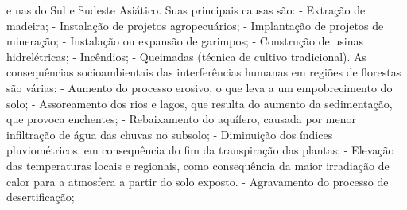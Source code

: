 e nas do Sul e Sudeste Asiático. Suas principais causas são:
- Extração de madeira;
- Instalação de projetos agropecuários;
- Implantação de projetos de mineração;
- Instalação ou expansão de garimpos;
- Construção de usinas hidrelétricas;
- Incêndios;
- Queimadas (técnica de cultivo tradicional).
As consequências socioambientais das interferências humanas em regiões de florestas são várias:
- Aumento do processo erosivo, o que leva a um empobrecimento do solo;
- Assoreamento dos rios e lagos, que resulta do aumento da sedimentação, que provoca enchentes;
- Rebaixamento do aquífero, causada por menor infiltração de água das chuvas no subsolo;
- Diminuição dos índices pluviométricos, em consequência do fim da transpiração das plantas;
- Elevação das temperaturas locais e regionais, como consequência da maior irradiação de calor para a atmosfera a 
partir do solo exposto.
- Agravamento do processo de desertificação;